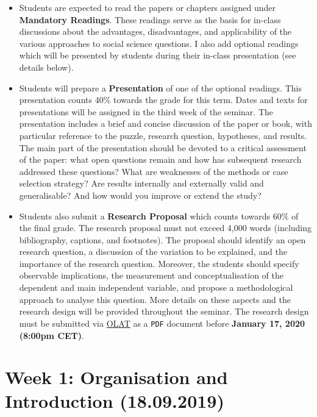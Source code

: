 \documentclass[abstract=on,parskip=full,headings=standardclasses,fontsize=11pt,paper=a4]{scrartcl}
\begin{document}
\begin{itemize}
\item Students are expected to read the papers or chapters assigned under \textbf{Mandatory Readings}. These readings serve as the basis for in-class discussions about the advantages, disadvantages, and applicability of the various approaches to social science questions. I also add optional readings which will be presented by students during their in-class presentation (see details below). 

\item Students will prepare a  \textbf{Presentation} of one of the optional readings. This presentation counts 40\% towards the grade for this term. Dates and texts for presentations will be assigned in the third week of the seminar. The presentation includes a brief and concise discussion of the paper or book, with particular reference to the puzzle, research question, hypotheses, and results. The main part of the presentation should be devoted to a critical assessment of the paper: what open questions remain and how has subsequent research addressed these questions? What are weaknesses of the methods or case selection strategy? Are results internally and externally valid and generalisable? And how would you improve or extend the study?

\item Students also submit a \textbf{Research Proposal} which counts towards 60\% of the final grade. The research proposal must not exceed 4,000 words  (including bibliography, captions, and footnotes).  The proposal  should identify an open research question, a discussion of the variation to be explained, and the importance of the research question. Moreover, the students should specify observable implications, the measurement and conceptualisation of the dependent and main independent variable, and propose a methodological approach to analyse this question. More details on these aspects and the research design will be provided throughout the seminar. The research design must be submitted via \href{https://lms.uzh.ch}{OLAT} as a \texttt{PDF} document before \textbf{January 17, 2020 (8:00pm CET)}. 
\end{itemize}





\tableofcontents

\section{Week 1: Organisation and Introduction (18.09.2019)}
\end{document}
